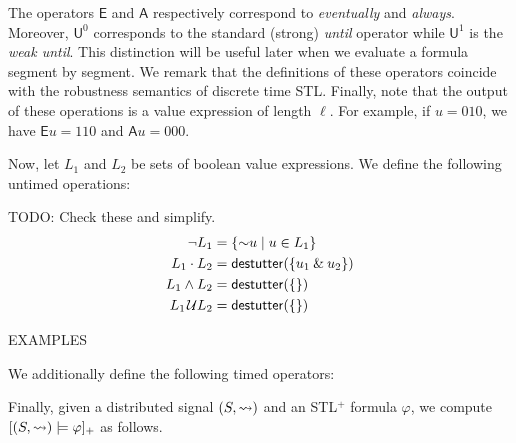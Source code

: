 The operators $\mathsf{E}$ and $\mathsf{A}$ respectively correspond to \emph{eventually} and \emph{always}.
Moreover, $\mathsf{U}^0$ corresponds to the standard (strong) \emph{until} operator while $\mathsf{U}^1$ is the \emph{weak until}.
This distinction will be useful later when we evaluate a formula segment by segment.
We remark that the definitions of these operators coincide with the robustness semantics of discrete time STL.
Finally, note that the output of these operations is a value expression of length $\ell$.
For example, if $u = 010$, we have $\mathsf{E} u = 110$ and $\mathsf{A} u = 000$.

Now, let $L_1$ and $L_2$ be sets of boolean value expressions.
We define the following untimed operations:

\alert{TODO: Check these and simplify.}
\small
\begin{align*}
	\lnot L_1 &= \{ \BitNeg u \st u \in L_1 \} \\
	L_1 \cdot L_2 &= \destutter( \{ u_1 \BitAnd u_2  \} ) \\
	L_1 \land L_2 &= \destutter( \{  \} ) \\
	L_1 \until L_2 &= \destutter( \{  \} )
\end{align*}
\normalsize

EXAMPLES

We additionally define the following timed operators:

\TODO

Finally, given a distributed signal $(S, {\rightsquigarrow})$ and an STL$^+$ formula $\varphi$, we compute $[(S, {\rightsquigarrow}) \models \varphi]_+$ as follows.

\TODO


